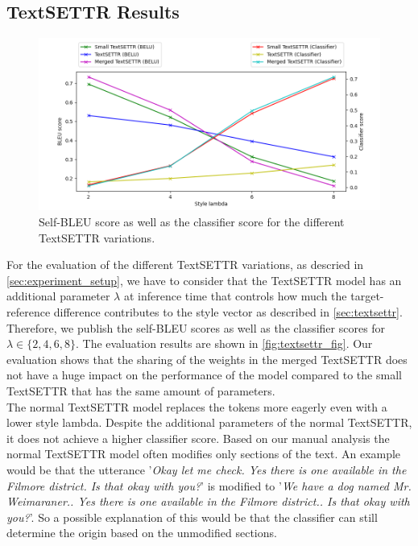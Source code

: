 \documentclass[twocolumn]{tum-article}
\begin{document}
\subsection{TextSETTR Results}
\begin{figure}[!h]
\centering
\includegraphics[width=\textwidth]{figures/eval_plot.png}
\caption{Self-BLEU score as well as the classifier score for the different TextSETTR variations.}
\label{fig:textsettr_fig}
\end{figure}
For the evaluation of the different TextSETTR variations, as descried in \autoref{sec:experiment_setup}, we have to consider that the TextSETTR model has an additional parameter $\lambda$ at inference time that controls how much the target-reference difference contributes to the style vector as described in \autoref{sec:textsettr}. Therefore, we publish the self-BLEU scores as well as the classifier scores for $\lambda \in \{2,4,6,8\}$. The evaluation results are shown in \autoref{fig:textsettr_fig}. Our evaluation shows that the sharing of the weights in the merged TextSETTR does not have a huge impact on the performance of the model compared to the small TextSETTR that has the same amount of parameters.\\ 
The normal TextSETTR model replaces the tokens more eagerly even with a lower style lambda. Despite the additional parameters of the normal TextSETTR, it does not achieve a higher classifier score. Based on our manual analysis the normal TextSETTR model often modifies only sections of the text. An example would be that the utterance '\textit{Okay let me check. Yes there is one available in the Filmore district. Is that okay with you?}' is modified to '\textit{We have a dog named Mr. Weimaraner.. Yes there is one available in the Filmore district.. Is that okay with you?}'. So a possible explanation of this would be that the classifier can still determine the origin based on the unmodified sections.\\
\end{document}
